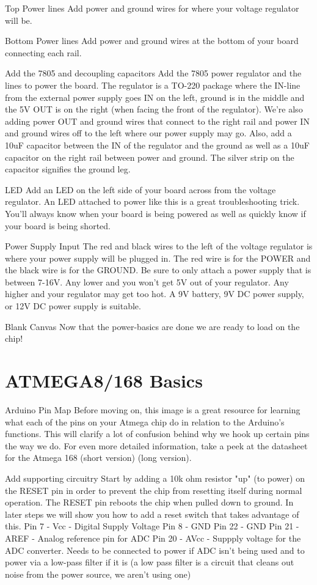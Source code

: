Top Power lines
Add power and ground wires for where your voltage regulator will be. 


Bottom Power lines
Add power and ground wires at the bottom of your board connecting each rail. 


Add the 7805 and decoupling capacitors
Add the 7805 power regulator and the lines to power the board. The regulator is a TO-220 package where the IN-line from the external power supply goes IN on the left, ground is in the middle and the 5V OUT is on the right (when facing the front of the regulator). We're also adding power OUT and ground wires that connect to the right rail and power IN and ground wires off to the left where our power supply may go.
Also, add a 10uF capacitor between the IN of the regulator and the ground as well as a 10uF capacitor on the right rail between power and ground. The silver strip on the capacitor signifies the ground leg.


LED
Add an LED on the left side of your board across from the voltage regulator. An LED attached to power like this is a great troubleshooting trick. You'll always know when your board is being powered as well as quickly know if your board is being shorted. 

Power Supply Input
The red and black wires to the left of the voltage regulator is where your power supply will be plugged in. The red wire is for the POWER and the black wire is for the GROUND. Be sure to only attach a power supply that is between 7-16V. Any lower and you won't get 5V out of your regulator. Any higher and your regulator may get too hot. A 9V battery, 9V DC power supply, or 12V DC power supply is suitable. 

Blank Canvas
Now that the power-basics are done we are ready to load on the chip!

\section{ATMEGA8/168 Basics}


Arduino Pin Map
Before moving on, this image is a great resource for learning what each of the pins on your Atmega chip do in relation to the Arduino's functions. This will clarify a lot of confusion behind why we hook up certain pins the way we do. For even more detailed information, take a peek at the datasheet for the Atmega 168 (short version) (long version).


Add supporting circuitry
Start by adding a 10k ohm resistor "up" (to power) on the RESET pin in order to prevent the chip from resetting itself during normal operation. The RESET pin reboots the chip when pulled down to ground. In later steps we will show you how to add a reset switch that takes advantage of this.
Pin 7 - Vcc - Digital Supply Voltage
Pin 8 - GND
Pin 22 - GND
Pin 21 - AREF - Analog reference pin for ADC
Pin 20 - AVcc - Suppply voltage for the ADC converter. Needs to be connected to power if ADC isn't being used and to power via a low-pass filter if it is (a low pass filter is a circuit that cleans out noise from the power source, we aren't using one)


